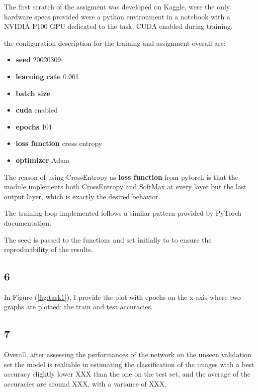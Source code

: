 \documentclass[11pt]{scrartcl}
\begin{document}
The first scratch of the assigment was developed on Kaggle, were the only hardware specs 
provided were a python environment in a notebook with a NVIDIA P100 GPU dedicated to the task,
CUDA enabled during training.

the configuration description for the training and assignment overall are:

\begin{itemize}
	\item \textbf{seed} 20020309 
	\item \textbf{learning rate} 0.001
	\item \textbf{batch size}
	\item \textbf{cuda} enabled
	\item \textbf{epochs} 101
	\item \textbf{loss function} cross entropy 
	\item \textbf{optimizer} Adam
\end{itemize}

The reason of using CrossEntropy as \textbf{loss function} from pytorch is that the 
module implements both CrossEntropy and SoftMax at every layer but the last output layer,
which is exactly the desired behavior.

The training loop implemented follows a similar pattern provided by PyTorch documentation.

The seed is passed to the functions 
and set initially to 
to ensure the reproducibility of the results.

\subsection*{6}

In Figure (\ref{fig:task1}), 
I provide the plot with epochs on the x-axis where two graphs are plotted:
the train and test accuracies.


\subsection*{7}

Overall, after assessing the performances of the network on the unseen validation set
the model is realiable in estimating the classification of the images with
a best accuracy slightly lower XXX than the one on the test set,
and the average of the accuracies are around XXX,
with a variance of XXX.
\end{document}
